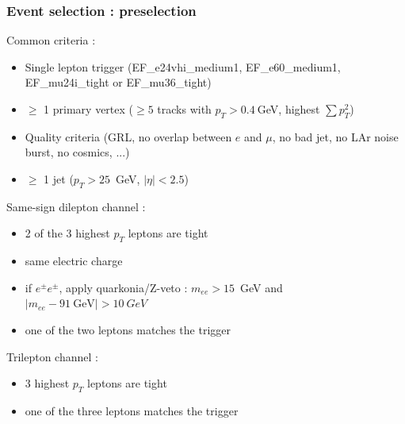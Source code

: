 \begin{frame}[plain]
\frametitle{Event selection : preselection}
\begin{small}
\begin{maliste}
\item Common criteria :
\begin{itemize}
\item Single lepton trigger (EF\_e24vhi\_medium1, EF\_e60\_medium1, EF\_mu24i\_tight or EF\_mu36\_tight)
\item $\geq$ 1 primary vertex ($\geq 5$ tracks with $p_T>0.4~$GeV, highest $\sum p_T^2$)
\item Quality criteria (GRL, no overlap between $e$ and $\mu$, no bad jet, no LAr noise burst, no cosmics, ...)
\item $\geq$ 1 jet ($p_T>25$~GeV, $|\eta|<2.5$)
\end{itemize}
\item Same-sign dilepton channel :
\begin{itemize}
\item 2 of the 3 highest $p_T$ leptons are tight 
\item same electric charge
\item if $e^{\pm}e^{\pm}$, apply quarkonia/Z-veto : $m_{ee}>15$~GeV and $|m_{ee}-91~\text{GeV}|>10~GeV$
\item one of the two leptons matches the trigger
\end{itemize}
\item Trilepton channel :
\begin{itemize}
\item 3 highest $p_T$ leptons are tight 
\item one of the three leptons matches the trigger
\end{itemize}
\end{maliste}
\end{small}
\end{frame}

